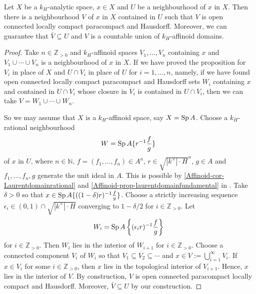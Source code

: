 \begin{proposition}\label{prop-kanalyticspacelocal}
    Let $X$ be a $k_H$-analytic space, $x\in X$ and $U$ be a neighbourhood of $x$ in $X$. Then there is a neighbourhood $V$ of $x$ in $X$ contained in $U$ such that $V$ is open connected locally compact paracompact and Hausdorff. Moreover, we can guarantee that $\bar{V}\subseteq U$ and $V$ is a countable union of $k_H$-affinoid domains.
\end{proposition}
\begin{proof}
    Take $n\in \mathbb{Z}_{>0}$ and $k_H$-affinoid spaces $V_1,\ldots,V_n$ containing $x$ and $V_1\cup\cdots\cup V_n$ is a neighbourhood of $x$ in $X$. If we have proved the proposition for $V_i$ in place of $X$ and $U\cap V_i$ in place of $U$ for $i=1,\ldots,n$, namely, if we have found open connected locally compact paracompact and Hausdorff sets $W_i$ containing $x$ and contained in $U\cap V_i$ whose closure in $V_i$ is contained in $U\cap V_i$,
    then we can take $V=W_1\cup\cdots\cup W_n$.

    So we may assume that $X$ is a $k_H$-affinoid space, say $X=\operatorname{Sp} A$. Choose a $k_H$-rational neighbourhood 
    \[
        W=\operatorname{Sp} A\{r^{-1}\frac{f}{g}\}  
    \]
    of $x$ in $U$, where $n\in \mathbb{N}$,  $f=(f_1,\ldots,f_n)\in A^n$, $r\in \sqrt{|k^{\times}|\cdot H}^n$, $g\in A$ and $f_1,\ldots,f_n,g$ generate the unit ideal in $A$. This is possible by \cref{Affinoid-cor-Laurentdomainrational} and \cref{Affinoid-prop-laurentdomainfundamental} in . 
    Take $\delta>0$ so that $x\in \operatorname{Sp} A\{((1-\delta)r)^{-1}\frac{f}{g}\}$.
    Choose a strictly increasing sequence $\epsilon_i\in (0,1)\cap \sqrt{|k^{\times}|\cdot H}$ converging to $1-\delta/2$ for $i\in \mathbb{Z}_{>0}$. Let 
    \[
        W_i=\operatorname{Sp} A\left\{ (\epsilon_i r)^{-1}\frac{f}{g} \right\}  
    \]
    for $i\in \mathbb{Z}_{>0}$.
    Then $W_i$ lies in the interior of $W_{i+1}$ for $i\in \mathbb{Z}_{>0}$. Choose a connected component $V_i$ of $W_i$ so that $V_1\subseteq V_2\subseteq \cdots$ and $x\in V:=\bigcup_{i=1}^{\infty} V_i$. If $x\in V_i$ for some $i\in \mathbb{Z}_{>0}$, then $x$ lies in the topological interior of $V_{i+1}$. Hence, $x$ lies in the interior of $V$. By construction, $V$ is open connected paracompact locally compact and Hausdorff. Moreover, $\bar{V}\subseteq U$ by our construction.
\end{proof}



